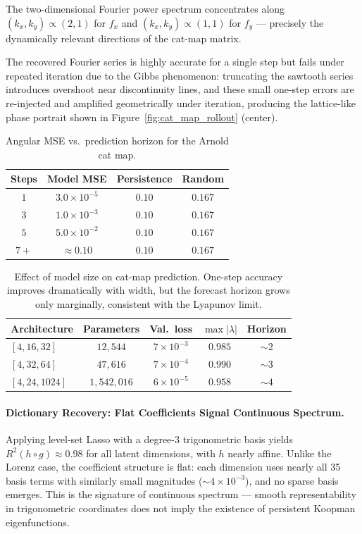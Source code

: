\documentclass{article}
\begin{document}
The two-dimensional Fourier power spectrum concentrates along $(k_x,k_y)\propto(2,1)$ for $f_x$ and $(k_x,k_y)\propto(1,1)$ for $f_y$ — precisely the dynamically relevant directions of the cat-map matrix.


The recovered Fourier series is highly accurate for a single step but fails under repeated iteration due to the Gibbs phenomenon: truncating the sawtooth series introduces overshoot near discontinuity lines, and these small one-step errors are re-injected and amplified geometrically under iteration, producing the lattice-like phase portrait shown in Figure~\ref{fig:cat_map_rollout} (center).

\begin{table}[!ht]
\centering
\begin{tabular}{cccc}
\toprule
Steps & Model MSE & Persistence & Random \\
\midrule
$1$   & $3.0\times10^{-5}$ & $0.10$ & $0.167$ \\
$3$   & $1.0\times10^{-3}$ & $0.10$ & $0.167$ \\
$5$   & $5.0\times10^{-2}$ & $0.10$ & $0.167$ \\
$7+$  & $\approx0.10$       & $0.10$ & $0.167$ \\
\bottomrule
\end{tabular}
\caption{Angular MSE vs.\ prediction horizon for the Arnold cat map.}
\label{tab:cat_prediction}
\end{table}


\begin{table}[!ht]
\centering
\begin{tabular}{lcccc}
\toprule
Architecture & Parameters & Val.\ loss & $\max|\lambda|$ & Horizon \\
\midrule
$[4,16,32]$     & $12{,}544$      & $7\times10^{-3}$ & $0.985$ & $\sim2$ \\
$[4,32,64]$     & $47{,}616$      & $7\times10^{-4}$ & $0.990$ & $\sim3$ \\
$[4,24,1024]$   & $1{,}542{,}016$ & $6\times10^{-5}$ & $0.958$ & $\sim4$ \\
\bottomrule
\end{tabular}
\caption{Effect of model size on cat-map prediction. One-step accuracy improves dramatically with width, but the forecast horizon grows only marginally, consistent with the Lyapunov limit.}
\label{tab:cat_model_scaling}
\end{table}


\paragraph{Dictionary Recovery: Flat Coefficients Signal Continuous Spectrum.}
Applying level-set Lasso with a degree-3 trigonometric basis yields $R^2(h\circ g)\approx 0.98$ for all latent dimensions, with $h$ nearly affine. Unlike the Lorenz case, the coefficient structure is flat: each dimension uses nearly all 35 basis terms with similarly small magnitudes ($\sim\!4\times10^{-3}$), and no sparse basis emerges. This is the signature of continuous spectrum — smooth representability in trigonometric coordinates does not imply the existence of persistent Koopman eigenfunctions.
\end{document}
